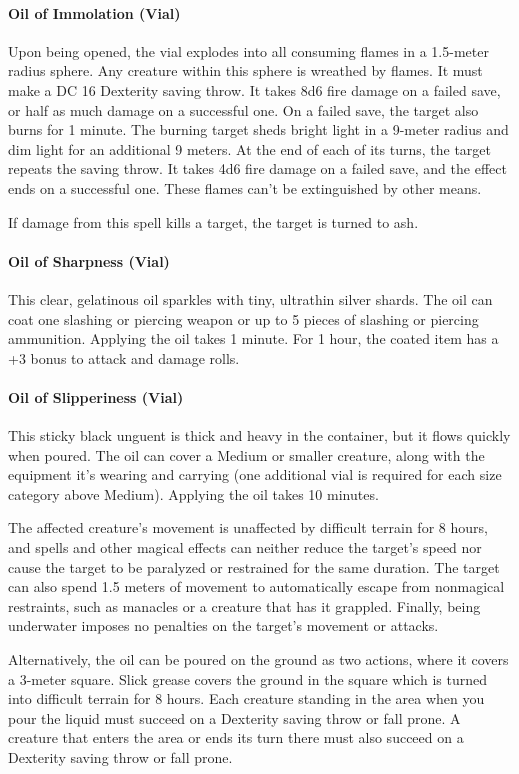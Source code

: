 \paragraph{Oil of Immolation (Vial)} %
    Upon being opened, the vial explodes into all consuming flames in a 1.5-meter radius sphere.
    Any creature within this sphere is wreathed by flames.
    It must make a DC 16 Dexterity saving throw.
    It takes 8d6 fire damage on a failed save, or half as much damage on a successful one.
    On a failed save, the target also burns for 1 minute.
    The burning target sheds bright light in a 9-meter radius and dim light for an additional 9 meters.
    At the end of each of its turns, the target repeats the saving throw.
    It takes 4d6 fire damage on a failed save, and the effect ends on a successful one.
    These flames can't be extinguished by other means.

    If damage from this spell kills a target, the target is turned to ash.
\paragraph{Oil of Sharpness (Vial)}
    This clear, gelatinous oil sparkles with tiny, ultrathin silver shards.
    The oil can coat one slashing or piercing weapon or up to 5 pieces of slashing or piercing ammunition.
    Applying the oil takes 1 minute.
    For 1 hour, the coated item has a +3 bonus to attack and damage rolls.
\paragraph{Oil of Slipperiness (Vial)} %
    This sticky black unguent is thick and heavy in the container, but it flows quickly when poured.
    The oil can cover a Medium or smaller creature, along with the equipment it's wearing and carrying (one additional vial is required for each size category above Medium).
    Applying the oil takes 10 minutes.

    The affected creature's movement is unaffected by difficult terrain for 8 hours, and spells and other magical effects can neither reduce the target's speed nor cause the target to be paralyzed or restrained for the same duration.
    The target can also spend 1.5 meters of movement to automatically escape from nonmagical restraints, such as manacles or a creature that has it grappled.
    Finally, being underwater imposes no penalties on the target's movement or attacks.

    Alternatively, the oil can be poured on the ground as two actions, where it covers a 3-meter square.
    Slick grease covers the ground in the square which is turned into difficult terrain for 8 hours.
    Each creature standing in the area when you pour the liquid must succeed on a Dexterity saving throw or fall prone.
    A creature that enters the area or ends its turn there must also succeed on a Dexterity saving throw or fall prone.
